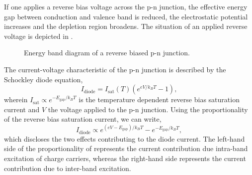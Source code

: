 If one applies a reverse bias voltage across the p-n junction, the effective energy gap between conduction and valence band is reduced, the electrostatic potential increases and the depletion region broadens.
The situation of an applied reverse voltage is depicted in .
\begin{figure}[H]
	\centering
	\caption{Energy band diagram of a reverse biased p-n junction.}\label{fig:pn_junction_reverse}
\end{figure}
The current-voltage characteristic of the p-n junction is described by the Schockley diode equation,
\begin{equation}
	I_\text{diode}=I_\text{sat}(T)\left(e^{eV/k_BT}-1\right)
	\label{eq:diode_current},
\end{equation}
wherein $I_\text{sat}\propto e^{-E_\text{gap}/k_BT}$ is the temperature dependent reverse bias saturation current and $V$ the voltage applied to the p-n junction.
Using the proportionality of the reverse bias saturation current, we can write,
\begin{equation}
	I_\text{diode}\propto e^{\left(eV-E_\text{gap}\right)/k_BT}-e^{-E_\text{gap}/k_BT}\label{eq:diode_current_prop},
\end{equation} 
which discloses the two effects contributing to the diode current.
The left-hand side of the proportionality of  represents the current contribution due intra-band excitation of charge carriers, whereas the right-hand side represents the current contribution due to inter-band excitation.
